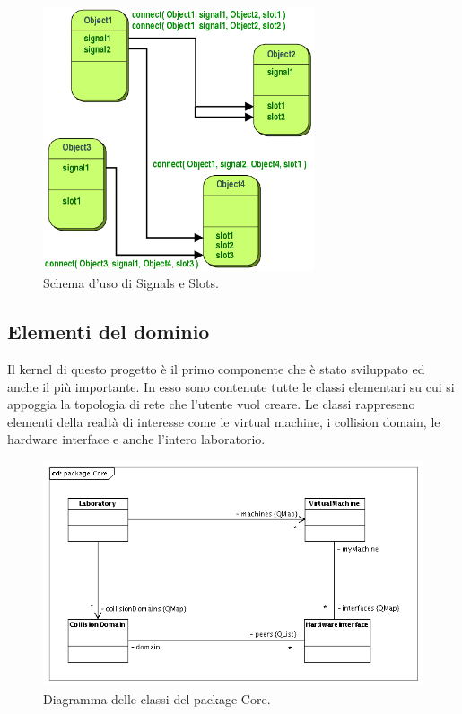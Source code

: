 \begin{figure}[!htb]
	\centering
	\includegraphics[width=8cm]{images/signals_slots.png}
	\caption{Schema d'uso di Signals e Slots.}
	\label{figura:qt_signals_slots}
\end{figure}

\subsection{Elementi del dominio}
Il kernel di questo progetto è il primo componente che è stato sviluppato ed anche il più importante. In esso sono contenute tutte le classi elementari su cui si appoggia la topologia di rete che l'utente vuol creare. Le classi rappreseno elementi della realtà di interesse come le virtual machine, i collision domain, le hardware interface e anche l'intero laboratorio.

\begin{figure}[!htb]
	\centering
	\includegraphics[width=12cm]{images/uml_package_core.png}
	\caption{Diagramma delle classi del package Core.}
	\label{figura:uml_package_core}
\end{figure}

